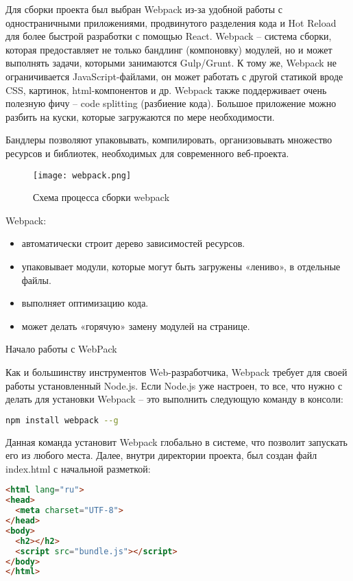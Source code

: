 Для сборки проекта был выбран Webpack из-за удобной работы с одностраничными приложениями, продвинутого разделения кода и Hot Reload для более быстрой разработки с помощью React.
Webpack -- система сборки, которая предоставляет не только бандлинг (компоновку) модулей, но и может выполнять задачи, которыми занимаются Gulp/Grunt. К тому же, Webpack не 
ограничивается JavaScript-файлами, он может работать с другой статикой вроде CSS, картинок, html-компонентов и др. Webpack также поддерживает очень полезную фичу -- code splitting 
(разбиение кода). Большое приложение можно разбить на куски, которые загружаются по мере необходимости.

Бандлеры позволяют упаковывать, компилировать, организовывать множество ресурсов и библиотек, необходимых для современного веб-проекта.

\begin{figure}[ht]
\centering
  \texttt{[image: webpack.png]}
  \caption{Схема процесса сборки webpack}
  \label{figure:domain:webpack}
\end{figure}

Webpack:
\begin{itemize}
\item автоматически строит дерево зависимостей ресурсов.
\item упаковывает модули, которые могут быть загружены «лениво», в отдельные файлы.
\item выполняет оптимизацию кода.
\item может делать «горячую» замену модулей на странице.
\end{itemize}

Начало работы с WebPack 

Как и большинству инструментов Web-разработчика, Webpack требует для своей работы установленный Node.js. Если Node.js уже настроен, то все, что нужно с
делать для установки Webpack -- это выполнить следующую команду в консоли:
\begin{lstlisting}[language=bash, label=lst:domain:html]
npm install webpack --g
\end{lstlisting}

Данная команда установит Webpack глобально в системе, что позволит запускать его из любого места. Далее, внутри директории проекта, был создан
файл index.html с начальной разметкой:
\begin{lstlisting}[language=HTML, label=lst:domain:html]
<html lang="ru">
<head>
  <meta charset="UTF-8">
</head>
<body>
  <h2></h2>
  <script src="bundle.js"></script>
</body>
</html>
\end{lstlisting}

